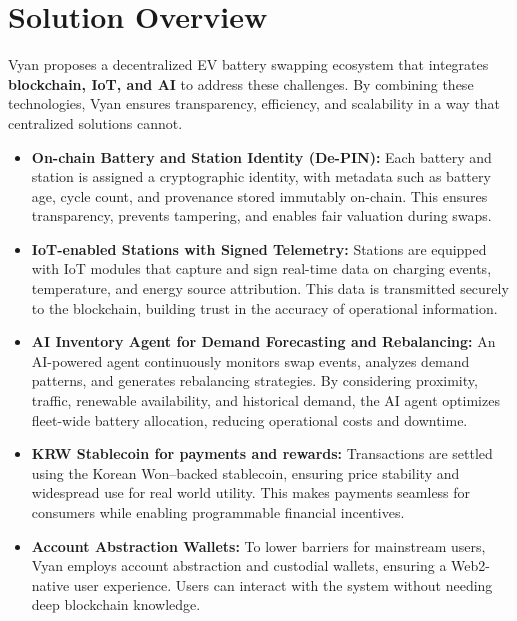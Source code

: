 \documentclass[12pt,a4paper]{article}
\begin{document}
\section{Solution Overview}

Vyan proposes a decentralized EV battery swapping ecosystem that integrates \textbf{blockchain, IoT, and AI} to address these challenges. By combining these technologies, Vyan ensures transparency, efficiency, and scalability in a way that centralized solutions cannot.  

\begin{itemize}[leftmargin=1.5em]
    \item \textbf{On-chain Battery and Station Identity (De-PIN):} Each battery and station is assigned a cryptographic identity, with metadata such as battery age, cycle count, and provenance stored immutably on-chain. This ensures transparency, prevents tampering, and enables fair valuation during swaps.
    
    \item \textbf{IoT-enabled Stations with Signed Telemetry:} Stations are equipped with IoT modules that capture and sign real-time data on charging events, temperature, and energy source attribution. This data is transmitted securely to the blockchain, building trust in the accuracy of operational information.
    
    \item \textbf{AI Inventory Agent for Demand Forecasting and Rebalancing:} An AI-powered agent continuously monitors swap events, analyzes demand patterns, and generates rebalancing strategies. By considering proximity, traffic, renewable availability, and historical demand, the AI agent optimizes fleet-wide battery allocation, reducing operational costs and downtime.
    
    \item \textbf{KRW Stablecoin for payments and rewards:} Transactions are settled using the Korean Won–backed stablecoin, ensuring price stability and widespread use for real world utility. This makes payments seamless for consumers while enabling programmable financial incentives.
    
    \item \textbf{Account Abstraction Wallets:} To lower barriers for mainstream users, Vyan employs account abstraction and custodial wallets, ensuring a Web2-native user experience. Users can interact with the system without needing deep blockchain knowledge.
\end{itemize}
\end{document}
